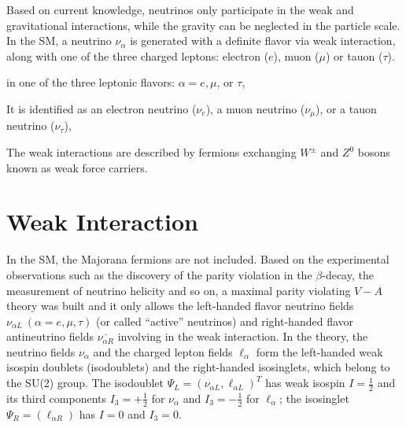 Based on current knowledge, neutrinos only participate in the weak and gravitational interactions, while the gravity can be neglected in the particle scale. In the SM, a neutrino $\nu_\alpha$ is generated with a definite flavor via weak interaction,  along with one of the three charged leptons: electron ($e$), muon ($\mu$) or tauon ($\tau$).




 in one of the three leptonic flavors: $\alpha=e,\mu$, or $\tau$, 


It is identified as an electron neutrino ($\nu_e$), a muon neutrino ($\nu_\mu$), or a tauon neutrino ($\nu_\tau$),

 The weak interactions are described by fermions exchanging $W^{\pm}$ and $Z^0$ bosons known as weak force carriers.

\section{Weak Interaction}\label{sect:weakInteraction}


 
In the SM, the Majorana fermions are not included. Based on the experimental observations such as the discovery of the parity violation in the $\beta$-decay\cite{wu1957experimental}, the measurement of neutrino helicity\cite{goldhaber1958helicity} and so on, a maximal parity violating $V-A$ theory was built and it only allows the left-handed flavor neutrino fields $\nu_{\alpha L}~(\alpha=e,\mu,\tau)$ (or called ``active'' neutrinos) and right-handed flavor antineutrino fields $\overline{\nu_{\alpha R}}$ involving in the weak interaction. In the theory, the neutrino fields $\nu_\alpha$ and the charged lepton fields $\ell_\alpha$ form the left-handed weak isospin doublets (isodoublets) and the right-handed isosinglets, which belong to the SU(2) group. The isodoublet $\Psi_L = (\nu_{\alpha L}, \ell_{\alpha L})^T$ has weak isospin $I=\frac{1}{2}$ and its third components $I_3=+\frac{1}{2}$ for $\nu_\alpha$ and $I_3=-\frac{1}{2}$ for $\ell_\alpha$; the isosinglet $\Psi_R = (\ell_{\alpha R})$ has $I=0$ and $I_3=0$\cite{aitchison2012gauge, greiner2012theoretical}.

